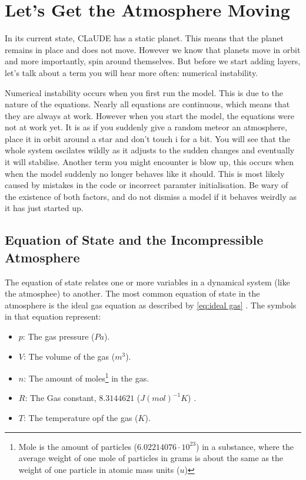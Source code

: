 \section{Let's Get the Atmosphere Moving}
In its current state, CLaUDE has a static planet. This means that the planet remains in place and does not move. However we know that planets move in orbit and more importantly, spin around 
themselves. But before we start adding layers, let's talk about a term you will hear more often: numerical instability.

Numerical instability occurs when you first run the model. This is due to the nature of the equations. Nearly all equations are continuous, which means that they are always at work. However 
when you start the model, the equations were not at work yet. It is as if you suddenly give a random meteor an atmosphere, place it in orbit around a star and don't touch i for a bit. You will 
see that the whole system oscilates wildly as it adjusts to the sudden changes and eventually it will stabilise. Another term you might encounter is blow up, this occurs when when the model 
suddenly no longer behaves like it should. This is most likely caused by mistakes in the code or incorrect paramter initialisation. Be wary of the existence of both factors, and do not dismiss 
a model if it behaves weirdly as it has just started up.

\subsection{Equation of State and the Incompressible Atmosphere}
The equation of state relates one or more variables in a dynamical system (like the atmosphee) to another. The most common equation of state in the atmosphere is the ideal gas equation as 
described by \autoref{eq:ideal gas} \cite{idealGas}. The symbols in that equation represent:

\begin{itemize}
    \item $p$: The gas pressure ($Pa$).
    \item $V$: The volume of the gas ($m^3$).
    \item $n$: The amount of moles\footnote{Mole is the amount of particles ($6.02214076 \cdot 10^{23}$) in a substance, where the average weight of one mole of particles in grams is about the 
    same as the weight of one particle in atomic mass units ($u$)\cite{mole}} in the gas.
    \item $R$: The Gas constant, $8.3144621$ ($J(mol)^{-1}K$) \cite{idealGas}.
    \item $T$: The temperature opf the gas ($K$).
\end{itemize}

